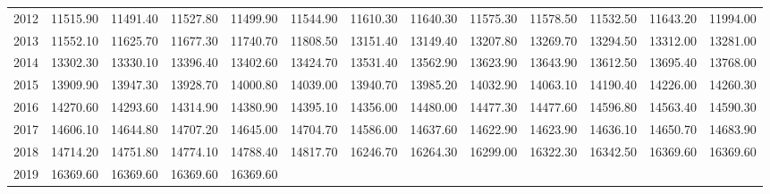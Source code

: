 \begin{longtable}{rrrrrrrrrrrrr}
  2012 & 11515.90 & 11491.40 & 11527.80 & 11499.90 & 11544.90 & 11610.30 & 11640.30 & 11575.30 & 11578.50 & 11532.50 & 11643.20 & 11994.00 \\ 
  2013 & 11552.10 & 11625.70 & 11677.30 & 11740.70 & 11808.50 & 13151.40 & 13149.40 & 13207.80 & 13269.70 & 13294.50 & 13312.00 & 13281.00 \\ 
  2014 & 13302.30 & 13330.10 & 13396.40 & 13402.60 & 13424.70 & 13531.40 & 13562.90 & 13623.90 & 13643.90 & 13612.50 & 13695.40 & 13768.00 \\ 
  2015 & 13909.90 & 13947.30 & 13928.70 & 14000.80 & 14039.00 & 13940.70 & 13985.20 & 14032.90 & 14063.10 & 14190.40 & 14226.00 & 14260.30 \\ 
  2016 & 14270.60 & 14293.60 & 14314.90 & 14380.90 & 14395.10 & 14356.00 & 14480.00 & 14477.30 & 14477.60 & 14596.80 & 14563.40 & 14590.30 \\ 
  2017 & 14606.10 & 14644.80 & 14707.20 & 14645.00 & 14704.70 & 14586.00 & 14637.60 & 14622.90 & 14623.90 & 14636.10 & 14650.70 & 14683.90 \\ 
  2018 & 14714.20 & 14751.80 & 14774.10 & 14788.40 & 14817.70 & 16246.70 & 16264.30 & 16299.00 & 16322.30 & 16342.50 & 16369.60 & 16369.60 \\ 
  2019 & 16369.60 & 16369.60 & 16369.60 & 16369.60 &  &  &  &  &  &  &  &  \\ 
   \hline
\hline
\end{longtable}
